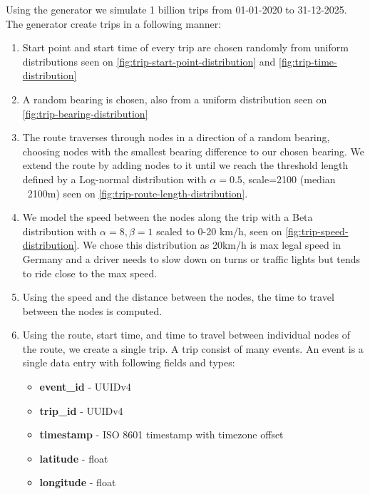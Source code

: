 Using the generator we simulate 1 billion trips from 01-01-2020 to 31-12-2025.
The generator create trips in a following manner:
\begin{enumerate}
	\item Start point and start time of every trip are chosen randomly from uniform distributions seen on \cref{fig:trip-start-point-distribution} and \cref{fig:trip-time-distribution}
	\item A random bearing is chosen, also from a uniform distribution seen on \cref{fig:trip-bearing-distribution}
\item The route traverses through nodes in a direction of a random bearing, choosing nodes with the smallest bearing difference to our chosen bearing.
	We extend the route by adding nodes to it until we reach the threshold length defined by a Log-normal distribution with $\alpha=0.5$, scale=2100 (median ~2100m) seen on \cref{fig:trip-route-length-distribution}.
\item We model the speed between the nodes along the trip with a Beta distribution with $\alpha=8, \beta=1$ scaled to 0-20 km/h, seen on \cref{fig:trip-speed-distribution}.
	We chose this distribution as 20km/h is max legal speed in Germany and a driver needs to slow down on turns or traffic lights but tends to ride close to the max speed.
\item Using the speed and the distance between the nodes, the time to travel between the nodes is computed.
\item Using the route, start time, and time to travel between individual nodes of the route, we create a single trip.
	A trip consist of many events. 
	An event is a single data entry with following fields and types:
	\begin{itemize}
		\item \textbf{event\_id} - UUIDv4
		\item \textbf{trip\_id} - UUIDv4
		\item \textbf{timestamp} - ISO 8601 timestamp with timezone offset
		\item \textbf{latitude} - float
		\item \textbf{longitude} - float
	\end{itemize}
\end{enumerate}

